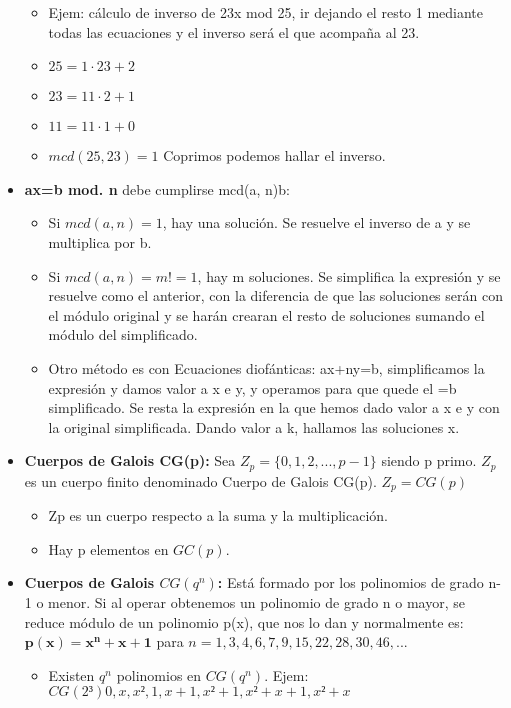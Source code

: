 \documentclass[12pt, twoside, openright]{report} %
\begin{document}
\begin{itemize}
\begin{itemize}
		      \item Ejem: cálculo de inverso de 23x mod 25, ir dejando el resto 1 mediante todas las ecuaciones y el inverso será el que acompaña al 23.
		      \item $25=1·23+2$
		      \item $23=11·2+1$
		      \item $11=11·1+0$
		      \item $mcd(25, 23)= 1$ Coprimos podemos hallar el inverso.
	      \end{itemize}
	\item \textbf{ax=b mod. n} debe cumplirse mcd(a, n)\textbar b:
	      \begin{itemize}
		      \item Si $mcd(a, n)= 1$, hay una solución. Se resuelve el inverso de a y se multiplica por b.
		      \item Si $mcd(a, n)=m!=1$, hay m soluciones. Se simplifica la expresión y se resuelve como el anterior, con la diferencia de que las soluciones serán con el módulo original y se harán crearan el resto de soluciones sumando el módulo del simplificado.
		      \item Otro método es con Ecuaciones diofánticas: ax+ny=b, simplificamos la expresión y damos valor a x e y, y operamos para que quede el =b simplificado. Se resta la expresión en la que hemos dado valor a x e y con la original simplificada. Dando valor a k, hallamos las soluciones x.
	      \end{itemize}
	\item \textbf{Cuerpos de Galois CG(p):} Sea $Z_p=\{0, 1, 2,..., p-1\}$ siendo p primo. $Z_p$ es un cuerpo finito denominado Cuerpo de Galois CG(p). $Z_p=CG(p)$
	      \begin{itemize}
		      \item Zp es un cuerpo respecto a la suma y la multiplicación.
		      \item Hay p elementos en $GC(p)$.
	      \end{itemize}
	\item \textbf{Cuerpos de Galois $CG(q^n)$:} Está formado por los polinomios de grado n-1 o menor. Si al operar obtenemos un polinomio de grado n o mayor, se reduce módulo de un polinomio p(x), que nos lo dan y normalmente es: $\boldsymbol{p(x)=x^n+x+1}$ para $n= 1, 3, 4, 6, 7, 9, 15, 22, 28, 30, 46,...$
	      \begin{itemize}
		      \item Existen $q^n$ polinomios en $CG(q^n)$. Ejem: $CG(2³) 0, x, x², 1, x+1, x²+1, x²+x+1, x²+x$

\end{itemize}
\end{itemize}
\end{document}
